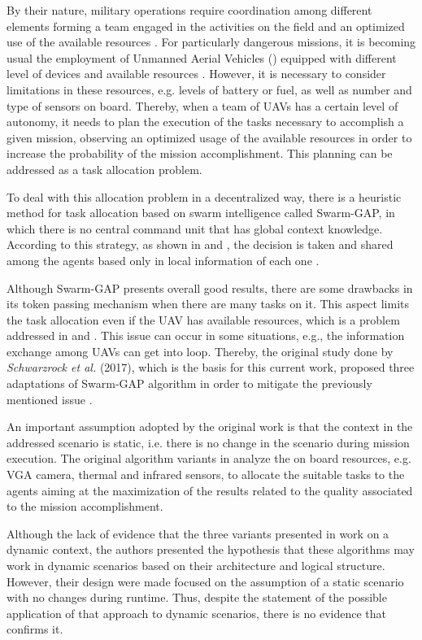 By their nature, military operations require coordination among different elements forming a team engaged in the activities on the field and an optimized use of the available resources \cite{CC01}. For particularly dangerous missions, it is becoming usual the employment  of Unmanned Aerial Vehicles (\uav) equipped with different level of devices and available resources \cite{nonami2010autonomous} \cite{UAV01}. However, it is necessary to consider limitations in these resources, e.g. levels of battery or fuel, as well as number and type of sensors on board. Thereby, when a team of UAVs has a certain level of autonomy, it needs to plan the execution of the tasks necessary to accomplish a given mission, observing an optimized usage of the available resources in order to increase the probability of the mission accomplishment. This planning can be addressed as a task allocation problem.

To deal with this allocation problem in a decentralized way, there is a heuristic method for task allocation based on swarm intelligence called Swarm-GAP\cite{ferreira2007swarm}, in which there is no central command unit that has global context knowledge. According to this strategy, as shown in \cite{MOEA07} and \cite{MOEA05}, the decision is taken and shared among the agents based only in local information of each one .

Although Swarm-GAP presents overall good results, there are some drawbacks in its token passing mechanism when there are many tasks on it. This aspect limits the task allocation even if the UAV has available resources, which is a problem addressed in \cite{MOEA07} and \cite{MAS07}. This issue can occur in some situations, e.g., the information exchange among UAVs can get into loop. Thereby, the original study done by \textit{Schwarzrock et al.} (2017)\cite{MAS07}, which is the basis for this current work, proposed three adaptations of Swarm-GAP algorithm in order to mitigate the previously mentioned issue .

An important assumption adopted by the original work is that the context in the addressed scenario is static, i.e. there is no change in the scenario during mission execution. The original algorithm variants in \cite{MAS07} analyze the on board resources, e.g. VGA camera, thermal and infrared sensors, to allocate the suitable tasks to the agents aiming at the maximization of the results related to the quality associated to the mission accomplishment. 

Although the lack of evidence that the three variants presented in \cite{MAS07} work on a dynamic context, the authors presented the hypothesis that these algorithms may work in dynamic scenarios based on their architecture and logical structure. However, their design were made focused on the assumption of a static scenario with no changes during runtime. Thus, despite the statement of the possible application of that approach to dynamic scenarios, there is no evidence that confirms it.


